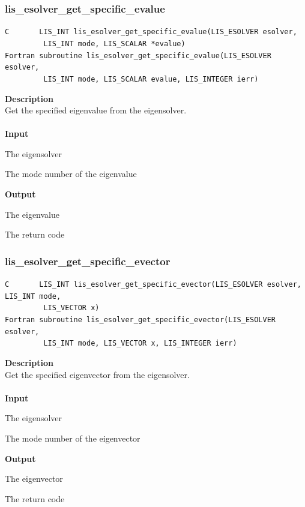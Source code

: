 \documentclass[a4paper]{article}
\newcommand{\namelistlabel}[1]{\mbox{#1}\hfill}
\newenvironment{namelist}[1]{%
\begin{list}{}
  {\let\makelabel\namelistlabel
  \settowidth{\labelwidth}{#1}
  \setlength{\leftmargin}{1.1\labelwidth}}
  }{%
\end{list}}
\begin{document}
\subsubsection{lis\_esolver\_get\_specific\_evalue}
\begin{screen}
\verb|C       LIS_INT lis_esolver_get_specific_evalue(LIS_ESOLVER esolver,|\\
\verb|         LIS_INT mode, LIS_SCALAR *evalue)|\\
\verb|Fortran subroutine lis_esolver_get_specific_evalue(LIS_ESOLVER esolver,|\\
\verb|         LIS_INT mode, LIS_SCALAR evalue, LIS_INTEGER ierr)|
\end{screen}
{\bf Description}\\
\indent
Get the specified eigenvalue from the eigensolver.
\\ \\
\noindent
{\bf Input}
\begin{namelist}{XXXXXXXXXXXXXXXXXXXX}
\item[\tt esolver] The eigensolver
\item[\tt mode] The mode number of the eigenvalue
\end{namelist}
{\bf Output}
\begin{namelist}{XXXXXXXXXXXXXXXXXXXX}
\item[\tt evalue]  The eigenvalue
\item[\tt ierr] The return code
\end{namelist}

\newpage
\subsubsection{lis\_esolver\_get\_specific\_evector}
\begin{screen}
\verb|C       LIS_INT lis_esolver_get_specific_evector(LIS_ESOLVER esolver, LIS_INT mode,|\\
\verb|         LIS_VECTOR x)|\\
\verb|Fortran subroutine lis_esolver_get_specific_evector(LIS_ESOLVER esolver,|\\
\verb|         LIS_INT mode, LIS_VECTOR x, LIS_INTEGER ierr)|
\end{screen}
{\bf Description}\\
\indent
Get the specified eigenvector from the eigensolver.
\\ \\
\noindent
{\bf Input}
\begin{namelist}{XXXXXXXXXXXXXXXXXXXX}
\item[\tt esolver] The eigensolver
\item[\tt mode] The mode number of the eigenvector
\end{namelist}
{\bf Output}
\begin{namelist}{XXXXXXXXXXXXXXXXXXXX}
\item[\tt x]  The eigenvector
\item[\tt ierr] The return code
\end{namelist}
\end{document}
